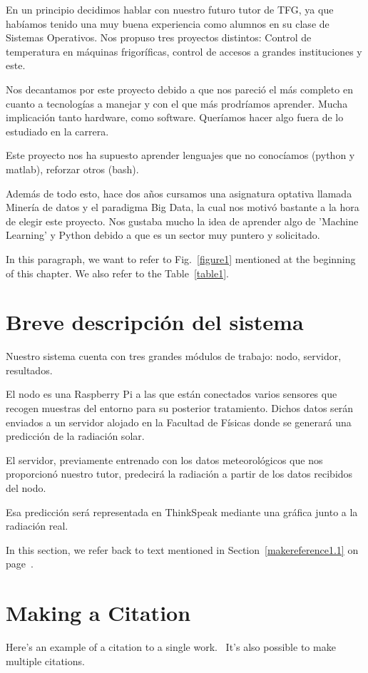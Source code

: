 En un principio decidimos hablar con nuestro futuro tutor de TFG, ya que habíamos tenido una muy buena experiencia como alumnos en su clase de Sistemas Operativos.
Nos propuso tres proyectos distintos: Control de temperatura en máquinas frigoríficas, control de accesos a grandes instituciones y este.

Nos decantamos por este proyecto debido a que nos pareció el más completo en cuanto a tecnologías a manejar y con el que más prodríamos aprender. Mucha implicación tanto hardware, como software. Queríamos hacer algo fuera de lo estudiado en la carrera.

Este proyecto nos ha supuesto aprender lenguajes que no conocíamos (python y matlab), reforzar otros (bash).

Además de todo esto, hace dos años cursamos una asignatura optativa llamada Minería de datos y el paradigma Big Data, la cual nos motivó bastante a la hora de elegir este proyecto. Nos gustaba mucho la idea de aprender algo de 'Machine Learning' y Python debido a que es un sector muy puntero y solicitado.

In this paragraph, we want to refer to Fig.~\ref{figure1}
mentioned at the beginning of this chapter.  We also refer to the
Table~\ref{table1}.

\section{Breve descripción del sistema}
\label{makereference1.2}

Nuestro sistema cuenta con tres grandes módulos de trabajo: nodo, servidor, resultados.

El nodo es una Raspberry Pi a las que están conectados varios sensores que recogen muestras del entorno para su posterior tratamiento. Dichos datos serán enviados a un servidor alojado en la Facultad de Físicas donde se generará una predicción de la radiación solar.

El servidor, previamente entrenado con los datos meteorológicos que nos proporcionó nuestro tutor, predecirá la radiación a partir de los datos recibidos del nodo. 

Esa predicción será representada en ThinkSpeak mediante una gráfica junto a la radiación real.

In this section, we refer back to text mentioned in
Section~\ref{makereference1.1} on page~\pageref{makereference1.1}.

\section{Making a Citation}
\label{makereference1.3}

Here's an example of a citation to a single
work.~\cite{CT:Weiner:1999} It's also possible to make multiple
citations.~\cite{CT:Phillips:1985, ARP:Loy:1974}
